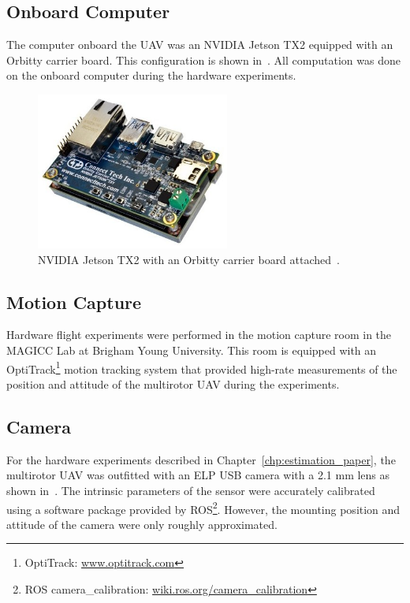 \subsection{Onboard Computer}
The computer onboard the UAV was an NVIDIA Jetson TX2 equipped with an Orbitty
carrier board. This configuration is shown in~. All
computation was done on the onboard computer during the hardware experiments.

\begin{figure}[h]
  \centering
  \includegraphics[width=2.5in]{figures/tx2_orbitty.jpg}
  \caption[NVIDIA Jetson TX2 with Orbitty Carrier Board]{NVIDIA Jetson TX2
  with an Orbitty carrier board attached~\cite{orbitty}.
  }
  \label{fig:tx2_orbitty}
\end{figure}

\subsection{Motion Capture}
Hardware flight experiments were performed in the motion capture room in the
MAGICC Lab at Brigham Young University. This room is equipped with an OptiTrack\footnote{OptiTrack:
\url{www.optitrack.com}}
motion tracking system that
provided high-rate measurements of the position and attitude of the multirotor
UAV during the experiments.

\subsection{Camera}
For the hardware experiments described in Chapter~\ref{chp:estimation_paper},
the multirotor UAV was outfitted with an ELP USB camera with a 2.1 mm lens as
shown in~. The intrinsic parameters of the sensor were
accurately calibrated using a software package provided by ROS\footnote{ROS
camera\_calibration:
\url{wiki.ros.org/camera_calibration}}.
However, the mounting position and attitude of the camera were only roughly
approximated.

